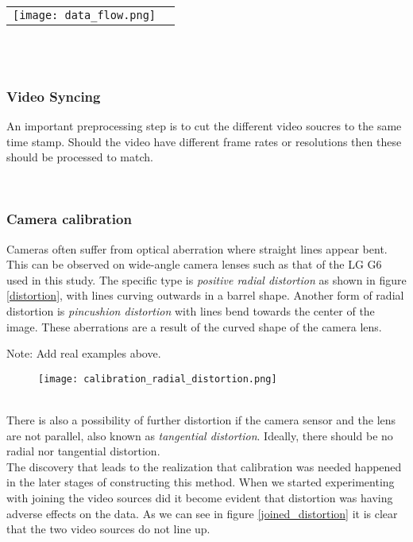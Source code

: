 \ \\ 
\noindent
\begin{tabular}{@{}cc}
\texttt{[image: data\_flow.png]} 
\end{tabular}
\label{data}
\ \\

\ \\

\subsubsection{Video Syncing}
An important preprocessing step is to cut the different video soucres to the same time stamp.
Should the video have different frame rates or resolutions then these should be processed to match.

\ \\

\subsubsection{Camera calibration}
Cameras often suffer from optical aberration where straight lines appear bent. This can be observed on wide-angle camera lenses such as that of the LG G6 used in this study.
The specific type is \textit{positive radial distortion} as shown in figure \ref{distortion}, with lines curving outwards in a barrel shape.
Another form of radial distortion is \textit{pincushion distortion} with lines bend towards the center of the image. These aberrations are a result 
of the curved shape of the camera lens.

Note: Add real examples above.
\ \\ 
\begin{figure}[h]
  \texttt{[image: calibration\_radial\_distortion.png]}
  \centering 
  \end{figure}
  \label{distortion}

\ \\

There is also a possibility of further distortion if the camera sensor and the lens are not parallel, also known as \textit{tangential distortion}.
Ideally, there should be no radial nor tangential distortion.
\ \\
The discovery that leads to the realization that calibration was needed happened in the later stages of constructing this method. When we
started experimenting with joining the video sources did it become evident that distortion was having adverse effects on the data. As we can see in figure 
\ref{joined_distortion} it is clear that the two video sources do not line up.

